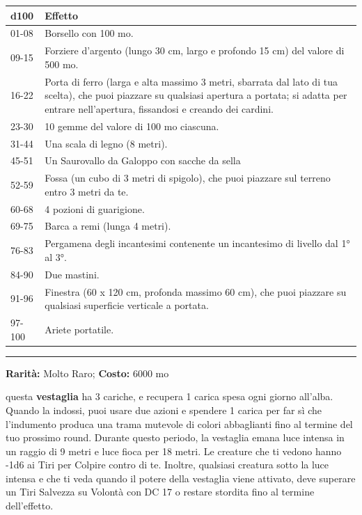 \begin{multicols}{2}
\noindent\begin{tabularx}{0.48\textwidth}{lX}
	\toprule
\textbf{d100} & \textbf{Effetto}\\
\toprule
01-08 &Borsello con 100 mo.\\
09-15& Forziere d'argento (lungo 30 cm, largo e profondo 15 cm) del valore di 500 mo.\\
16-22& Porta di ferro (larga e alta massimo 3 metri, sbarrata dal lato di tua scelta), che puoi piazzare su qualsiasi apertura a portata; si adatta per entrare nell'apertura, fissandosi e creando dei cardini.\\
23-30 &10 gemme del valore di 100 mo ciascuna.\\
31-44 &Una scala di legno (8 metri).\\
45-51 &Un Saurovallo da Galoppo con sacche da sella \\
52-59 & Fossa (un cubo di 3 metri di spigolo), che puoi piazzare sul terreno entro 3 metri da te.\\
60-68 &4 pozioni di guarigione. \\
69-75 &Barca a remi (lunga 4 metri).\\
76-83& Pergamena degli incantesimi contenente un incantesimo di livello dal 1° al 3°.\\
84-90& Due mastini.\\
91-96 &Finestra (60 x 120 cm, profonda massimo 60 cm), che puoi piazzare su qualsiasi superficie verticale a portata.\\
97-100 &Ariete portatile.
\end{tabularx}


\medskip

\smallskip\noindent\rule{\linewidth}{2pt}  \hypertarget{TunicadeiColoriScintillanti}{}\smallskip{}\noindent\label{TunicadeiColoriScintillanti}

\textbf{Rarità:} Molto Raro; \textbf{Costo:} 6000 mo

questa \textbf{vestaglia} ha 3 cariche, e recupera 1 carica spesa ogni giorno all'alba. Quando la indossi, puoi usare due azioni e spendere 1 carica per far sì che l'indumento produca una trama mutevole di colori abbaglianti fino al termine del tuo prossimo round. Durante questo periodo, la vestaglia emana luce intensa in un raggio di 9 metri e luce fioca per 18 metri. Le creature che ti vedono hanno -1d6 ai Tiri per Colpire contro di te. Inoltre, qualsiasi creatura sotto la luce intensa e che ti veda quando il potere della vestaglia viene attivato, deve superare un Tiri Salvezza su Volontà con DC 17 o restare stordita fino al termine dell'effetto.


\end{multicols}
